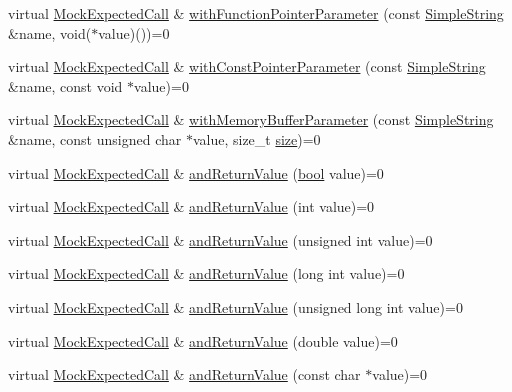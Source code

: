 \begin{DoxyCompactItemize}
\item 
virtual \hyperlink{class_mock_expected_call}{Mock\+Expected\+Call} \& \hyperlink{class_mock_expected_call_abb49706832ae5b0a4fe0806596481212}{with\+Function\+Pointer\+Parameter} (const \hyperlink{class_simple_string}{Simple\+String} \&name, void($\ast$value)())=0
\item 
virtual \hyperlink{class_mock_expected_call}{Mock\+Expected\+Call} \& \hyperlink{class_mock_expected_call_ace01331d7495b17c3aeb41dc35e001fb}{with\+Const\+Pointer\+Parameter} (const \hyperlink{class_simple_string}{Simple\+String} \&name, const void $\ast$value)=0
\item 
virtual \hyperlink{class_mock_expected_call}{Mock\+Expected\+Call} \& \hyperlink{class_mock_expected_call_a759b89a74912377900f7879e236d4d67}{with\+Memory\+Buffer\+Parameter} (const \hyperlink{class_simple_string}{Simple\+String} \&name, const unsigned char $\ast$value, size\+\_\+t \hyperlink{gst__avb__playbin_8c_a439227feff9d7f55384e8780cfc2eb82}{size})=0
\item 
virtual \hyperlink{class_mock_expected_call}{Mock\+Expected\+Call} \& \hyperlink{class_mock_expected_call_a4827ac954505dd92b7f8d9c2637b3db8}{and\+Return\+Value} (\hyperlink{avb__gptp_8h_af6a258d8f3ee5206d682d799316314b1}{bool} value)=0
\item 
virtual \hyperlink{class_mock_expected_call}{Mock\+Expected\+Call} \& \hyperlink{class_mock_expected_call_a983ab4caf6e4384f68a257e516a5e73b}{and\+Return\+Value} (int value)=0
\item 
virtual \hyperlink{class_mock_expected_call}{Mock\+Expected\+Call} \& \hyperlink{class_mock_expected_call_a74fcf190af3f97ecf5fd57ce913d4a43}{and\+Return\+Value} (unsigned int value)=0
\item 
virtual \hyperlink{class_mock_expected_call}{Mock\+Expected\+Call} \& \hyperlink{class_mock_expected_call_a181d27a08651ae14b821863979882460}{and\+Return\+Value} (long int value)=0
\item 
virtual \hyperlink{class_mock_expected_call}{Mock\+Expected\+Call} \& \hyperlink{class_mock_expected_call_abde9f48c3bf91de1232b4603610a1067}{and\+Return\+Value} (unsigned long int value)=0
\item 
virtual \hyperlink{class_mock_expected_call}{Mock\+Expected\+Call} \& \hyperlink{class_mock_expected_call_a56360a8140a5f6ac848c5b693822809e}{and\+Return\+Value} (double value)=0
\item 
virtual \hyperlink{class_mock_expected_call}{Mock\+Expected\+Call} \& \hyperlink{class_mock_expected_call_ad0366030b9964c0394b32edbbe45ce97}{and\+Return\+Value} (const char $\ast$value)=0

\end{DoxyCompactItemize}

